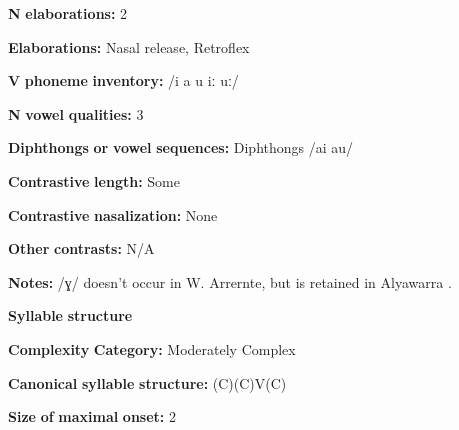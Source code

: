\documentclass[output=paper]{langsci/langscibook}
\begin{document}
\begin{styleBody}
\textbf{N} \textbf{elaborations:} 2
\end{styleBody}

\begin{styleBody}
\textbf{Elaborations:} Nasal release, Retroflex
\end{styleBody}

\begin{styleBody}
\textbf{V} \textbf{phoneme} \textbf{inventory:} /i a u iː uː/
\end{styleBody}

\begin{styleBody}
\textbf{N} \textbf{vowel} \textbf{qualities:} 3
\end{styleBody}

\begin{styleBody}
\textbf{Diphthongs} \textbf{or} \textbf{vowel} \textbf{sequences:} Diphthongs /ai au/
\end{styleBody}

\begin{styleBody}
\textbf{Contrastive} \textbf{length:} Some
\end{styleBody}

\begin{styleBody}
\textbf{Contrastive} \textbf{nasalization:} None
\end{styleBody}

\begin{styleBody}
\textbf{Other} \textbf{contrasts:} N/A
\end{styleBody}

\begin{styleBody}
\textbf{Notes:} /ɣ/ doesn’t occur in W. Arrernte, but is retained in Alyawarra \citep[12]{Yallop1977}.
\end{styleBody}

\begin{styleBody}
\textbf{Syllable} \textbf{structure}
\end{styleBody}

\begin{styleBody}
\textbf{Complexity} \textbf{Category:} Moderately Complex
\end{styleBody}

\begin{styleBody}
\textbf{Canonical} \textbf{syllable} \textbf{structure:} (C)(C)V(C) \citep[41-5]{Yallop1977}
\end{styleBody}

\begin{styleBody}
\textbf{Size} \textbf{of} \textbf{maximal} \textbf{onset:} 2
\end{styleBody}
\end{document}
